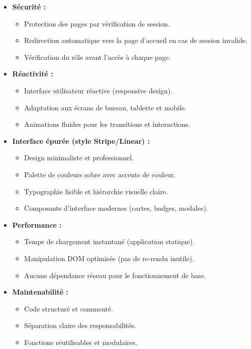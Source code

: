 \documentclass[12pt,a4paper,twoside]{report}
\begin{document}
\begin{itemize}
    \item \textbf{Sécurité :}
    \begin{itemize}
        \item Protection des pages par vérification de session.
        \item Redirection automatique vers la page d'accueil en cas de session invalide.
        \item Vérification du rôle avant l'accès à chaque page.
    \end{itemize}
    
    \item \textbf{Réactivité :}
    \begin{itemize}
        \item Interface utilisateur réactive (responsive design).
        \item Adaptation aux écrans de bureau, tablette et mobile.
        \item Animations fluides pour les transitions et interactions.
    \end{itemize}
    
    \item \textbf{Interface épurée (style Stripe/Linear) :}
    \begin{itemize}
        \item Design minimaliste et professionnel.
        \item Palette de couleurs sobre avec accents de couleur.
        \item Typographie lisible et hiérarchie visuelle claire.
        \item Composants d'interface modernes (cartes, badges, modales).
    \end{itemize}
    
    \item \textbf{Performance :}
    \begin{itemize}
        \item Temps de chargement instantané (application statique).
        \item Manipulation DOM optimisée (pas de re-rendu inutile).
        \item Aucune dépendance réseau pour le fonctionnement de base.
    \end{itemize}
    
    \item \textbf{Maintenabilité :}
    \begin{itemize}
        \item Code structuré et commenté.
        \item Séparation claire des responsabilités.
        \item Fonctions réutilisables et modulaires.
    \end{itemize}
\end{itemize}
\end{document}
